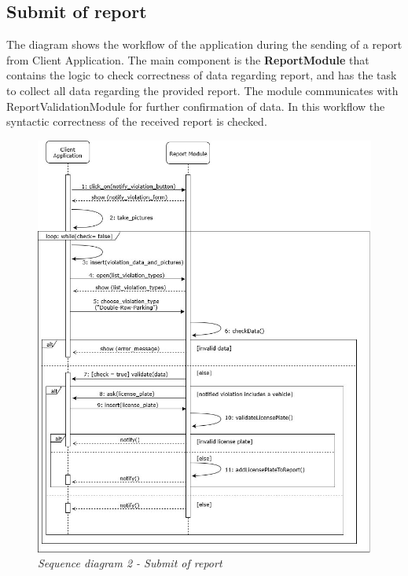 \subsection{Submit of report}
The diagram shows the workflow of the application during the sending of a report from Client Application. The main 
component is the \textbf{ReportModule} that contains the logic to check correctness of data regarding report, and has the task to collect all
data regarding the provided report. The module communicates with ReportValidationModule for further confirmation of data. In this workflow 
the syntactic correctness of the received report is checked.  

\begin{figure}[H]
  \centering
  \includegraphics[origin=c,width=\textwidth]{DD_Images/RunTimeView/2.jpg}
  \caption{\textit{Sequence diagram 2 - Submit of report}}
\end{figure}

